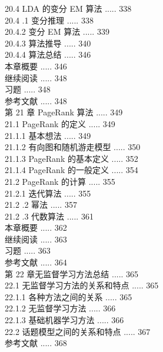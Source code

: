 \documentclass[10pt]{article}
\begin{document}
\begin{CJK*}{UTF8}{bsmi}
20.4 LDA 的变分 EM 算法 ..... 338\\
20.4 .1 变分推理 ..... 338\\
20.4.2 变分 EM 算法 ..... 339\\
20.4.3 算法推导 ..... 340\\
20.4.4 算法总结 ..... 346\\
本章概要 ..... 346\\
继续阅读 ..... 348\\
习题 ..... 348\\
参考文献 ..... 348\\
第 21 章 PageRank 算法 ..... 349\\
21.1 PageRank 的定义 ..... 349\\
21.1.1 基本想法 ..... 349\\
21.1.2 有向图和随机游走模型 ..... 350\\
21.1.3 PageRank 的基本定义 ..... 352\\
21.1.4 PageRank 的一般定义 ..... 354\\
21.2 PageRank 的计算 ..... 355\\
21.2.1 迭代算法 ..... 355\\
21.2 .2 幂法 ..... 357\\
21.2 .3 代数算法 ..... 361\\
本章概要 ..... 362\\
继续阅读 ..... 363\\
习题 ..... 363\\
参考文献 ..... 364\\
第 22 章无监督学习方法总结 ..... 365\\
22.1 无监督学习方法的关系和特点 ..... 365\\
22.1.1 各种方法之间的关系 ..... 365\\
22.1.2 无监督学习方法 ..... 366\\
22.1.3 基础机器学习方法 ..... 366\\
22.2 话题模型之间的关系和特点 ..... 367\\
参考文献 ..... 368


\end{CJK*}
\end{document}
